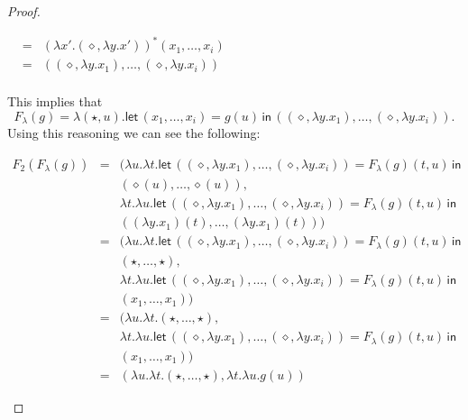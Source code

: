 \documentclass{elsarticle}
\begin{document}
\begin{proof}
\begin{report}
\begin{center}
\begin{itemize}
\begin{center}
\begin{math}
\begin{array}{lll}
            & = & (\lambda x'.(\diamond,\lambda y.x'))^*(x_1,\ldots,x_i)\\
            & = & ((\diamond,\lambda y.x_1),\ldots,(\diamond,\lambda y.x_i))\\
          \end{array}
        \end{math}
      \end{center}
      This implies that 
      \[ F_\lambda(g) = \lambda (\star,u).\mathsf{let}\,(x_1,\ldots,x_i) = g(u)\,\mathsf{in}\,((\diamond,\lambda y.x_1),\ldots,(\diamond,\lambda y.x_i)).\]
      Using this reasoning we can see the following:
      \begin{center}
        \begin{math}
          \begin{array}{lll}
            F_2(F_\lambda(g))
            & = & (\lambda u.\lambda t.\mathsf{let}\,((\diamond,\lambda y.x_1),\ldots,(\diamond,\lambda y.x_i)) = F_\lambda(g)(t,u)\,\mathsf{in}\,\\
                  & & (\diamond(u),\ldots,\diamond(u)),\\            
            & & \lambda t.\lambda u.\mathsf{let}\,((\diamond,\lambda y.x_1),\ldots,(\diamond,\lambda y.x_i)) = F_\lambda(g)(t,u)
                \,\mathsf{in}\, \\
            & & ((\lambda y.x_1)(t),\ldots,(\lambda y.x_1)(t)))\\
            & = & (\lambda u.\lambda t.\mathsf{let}\,((\diamond,\lambda y.x_1),\ldots,(\diamond,\lambda y.x_i)) = F_\lambda(g)(t,u)\,\mathsf{in}\,\\
            & & (\star,\ldots,\star),\\            
            & & \lambda t.\lambda u.\mathsf{let}\,((\diamond,\lambda y.x_1),\ldots,(\diamond,\lambda y.x_i)) = F_\lambda(g)(t,u)
                \,\mathsf{in}\, \\
            & & (x_1,\ldots,x_1))\\
            & = & (\lambda u.\lambda t.(\star,\ldots,\star),\\            
            & & \lambda t.\lambda u.\mathsf{let}\,((\diamond,\lambda y.x_1),\ldots,(\diamond,\lambda y.x_i)) = F_\lambda(g)(t,u)
                \,\mathsf{in}\, \\
            & & (x_1,\ldots,x_1))\\
            & = & (\lambda u.\lambda t.(\star,\ldots,\star), \lambda t.\lambda u.g(u))
          \end{array}
        \end{math}

\end{center}
\end{itemize}
\end{center}
\end{report}
\end{proof}
\end{document}
